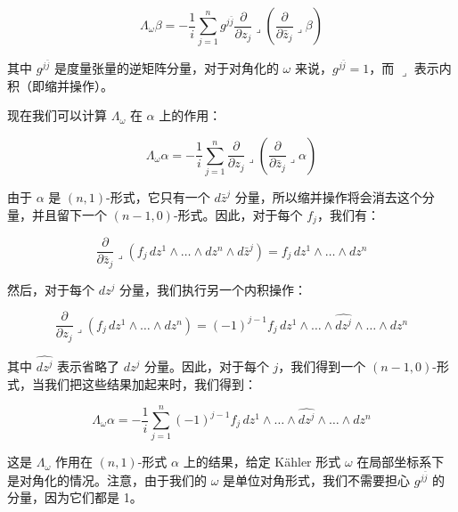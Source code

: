\[
\Lambda_\omega \beta = -\frac{1}{i} \sum_{j=1}^{n} g^{j\bar{j}} \frac{\partial}{\partial z_j} \lrcorner \left( \frac{\partial}{\partial \bar{z}_j} \lrcorner \beta \right)
\]

其中 \(g^{j\bar{j}}\) 是度量张量的逆矩阵分量，对于对角化的 \(\omega\) 来说，\(g^{j\bar{j}} = 1\)，而 \(\lrcorner\) 表示内积（即缩并操作）。

现在我们可以计算 \(\Lambda_\omega\) 在 \(\alpha\) 上的作用：

\[
\Lambda_\omega \alpha = -\frac{1}{i} \sum_{j=1}^{n} \frac{\partial}{\partial z_j} \lrcorner \left( \frac{\partial}{\partial \bar{z}_j} \lrcorner \alpha \right)
\]

由于 \(\alpha\) 是 \((n,1)\)-形式，它只有一个 \(d\bar{z}^j\) 分量，所以缩并操作将会消去这个分量，并且留下一个 \((n-1,0)\)-形式。因此，对于每个 \(f_j\)，我们有：

\[
\frac{\partial}{\partial \bar{z}_j} \lrcorner (f_j \, dz^1 \wedge \ldots \wedge dz^n \wedge d\bar{z}^j) = f_j \, dz^1 \wedge \ldots \wedge dz^n
\]

然后，对于每个 \(dz^j\) 分量，我们执行另一个内积操作：

\[
\frac{\partial}{\partial z_j} \lrcorner (f_j \, dz^1 \wedge \ldots \wedge dz^n) = (-1)^{j-1} f_j \, dz^1 \wedge \ldots \wedge \widehat{dz^j} \wedge \ldots \wedge dz^n
\]

其中 \(\widehat{dz^j}\) 表示省略了 \(dz^j\) 分量。因此，对于每个 \(j\)，我们得到一个 \((n-1,0)\)-形式，当我们把这些结果加起来时，我们得到：

\[
\Lambda_\omega \alpha = -\frac{1}{i} \sum_{j=1}^{n} (-1)^{j-1} f_j \, dz^1 \wedge \ldots \wedge \widehat{dz^j} \wedge \ldots \wedge dz^n
\]

这是 \(\Lambda_\omega\) 作用在 \((n, 1)\)-形式 \(\alpha\) 上的结果，给定 Kähler 形式 \(\omega\) 在局部坐标系下是对角化的情况。注意，由于我们的 \(\omega\) 是单位对角形式，我们不需要担心 \(g^{j\bar{j}}\) 的分量，因为它们都是 1。

